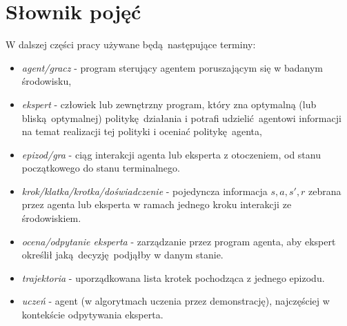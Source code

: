 \section{Słownik pojęć}

W dalszej części pracy używane będą następujące terminy:

\begin{itemize}
\item \textit{agent/gracz} - program sterujący agentem poruszającym się w badanym środowisku,
\item \textit{ekspert} - człowiek lub zewnętrzny program, który zna optymalną (lub bliską optymalnej) politykę działania i potrafi udzielić agentowi informacji na temat realizacji tej polityki i oceniać politykę agenta,
\item \textit{epizod/gra} - ciąg interakcji agenta lub eksperta z otoczeniem, od stanu początkowego do stanu terminalnego.
\item \textit{krok/klatka/krotka/doświadczenie} - pojedyncza informacja $s,a,s',r$ zebrana przez agenta lub eksperta w ramach jednego kroku interakcji ze środowiskiem.  
\item \textit{ocena/odpytanie eksperta} - zarządzanie przez program agenta, aby ekspert określił jaką decyzję podjąłby w danym stanie.
\item \textit{trajektoria} - uporządkowana lista krotek pochodząca z jednego epizodu.
\item \textit{uczeń} - agent (w algorytmach uczenia przez demonstrację), najczęściej w kontekście odpytywania eksperta.
\end{itemize}
